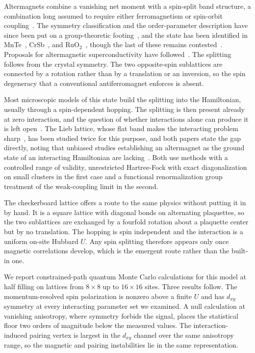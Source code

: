 \documentclass[aps,prb,reprint,superscriptaddress,amsmath,amssymb,floatfix]{revtex4-2}
\begin{document}
Altermagnets combine a vanishing net moment with a spin-split band structure, a
combination long assumed to require either ferromagnetism or spin-orbit
coupling~\cite{Smejkal2022a,Smejkal2022b,SmejkalCrystal,Mazin2021}. The symmetry
classification and the order-parameter description have since been put on a
group-theoretic footing~\cite{McClarty2024,Bhowal2024,Roig2024}, and the state has
been identified in MnTe~\cite{Krempasky2024,Lee2024,Hariki2025},
CrSb~\cite{Reimers2024}, and RuO$_2$~\cite{Feng2022,Fedchenko2024}, though the last
of these remains contested~\cite{Bai2024}. Proposals for altermagnetic
superconductivity have followed~\cite{Brekke2023,Ouassou2023,Zhu2023,Chakraborty2024}.
The splitting follows from the crystal
symmetry. The two opposite-spin sublattices are connected by a rotation rather
than by a translation or an inversion, so the spin degeneracy that a conventional
antiferromagnet enforces is absent.

Most microscopic models of this state build the splitting into the Hamiltonian,
usually through a spin-dependent hopping. The splitting is then present already
at zero interaction, and the question of whether interactions alone can produce
it is left open~\cite{Leeb2024}. The Lieb lattice, whose flat band makes the
interacting problem sharp~\cite{Lieb1989,Mielke1991,Tasaki1992}, has been studied
twice for this purpose, and both papers state the gap directly,
noting that unbiased studies establishing an altermagnet as the ground state of
an interacting Hamiltonian are lacking~\cite{Kaushal2025,Duerrnagel2025}. Both
use methods with a controlled range of validity, unrestricted Hartree-Fock with
exact diagonalization on small clusters in the first case and a functional
renormalization group treatment of the weak-coupling limit in the second.

The checkerboard lattice offers a route to the same physics without putting it in
by hand. It is a square lattice with diagonal bonds on alternating plaquettes, so
the two sublattices are exchanged by a fourfold rotation about a plaquette center
but by no translation. The hopping is spin independent and the interaction is a
uniform on-site Hubbard $U$. Any spin splitting therefore appears only once
magnetic correlations develop, which is the emergent route rather than the
built-in one.

We report constrained-path quantum Monte Carlo calculations for this model at
half filling on lattices from $8\times8$ up to $16\times16$ sites. Three results
follow. The momentum-resolved spin polarization is nonzero above a finite $U$ and
has $d_{xy}$ symmetry at every interacting parameter set we examined. A null
calculation at vanishing anisotropy, where symmetry forbids the signal, places
the statistical floor two orders of magnitude below the measured values. The
interaction-induced pairing vertex is largest in the $d_{xy}$ channel over the
same anisotropy range, so the magnetic and pairing instabilities lie in the same
representation.
\end{document}
